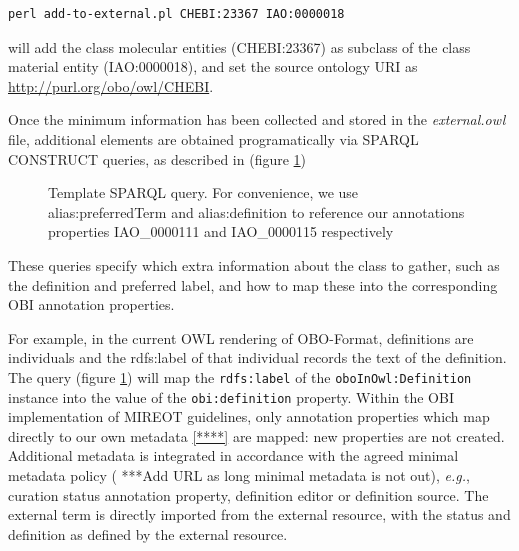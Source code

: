 \documentclass[a4paper,10pt,twocolumn]{article}
\begin{document}
\begin{footnotesize}
\begin{verbatim}
perl add-to-external.pl CHEBI:23367 IAO:0000018
\end{verbatim}
\end{footnotesize}

will add the class molecular entities (CHEBI:23367) as subclass of the class material entity (IAO:0000018), and set the source ontology URI as \url{http://purl.org/obo/owl/CHEBI}.

Once the minimum information has been collected  and stored in the \emph{external.owl} file, additional elements are obtained programatically via SPARQL\cite{RefWorks:1531} CONSTRUCT queries, as described in (figure \ref{fig:sparql})




\begin{figure}[t]
%  
\scriptsize
 
\caption{Template SPARQL query. For convenience, we use alias:preferredTerm and
alias:definition to reference our annotations properties IAO\_0000111 and IAO\_0000115 respectively}
\label{fig:sparql}
\end{figure}
These queries specify which extra information about the class to gather, such as the definition and preferred label, and how to map these into the corresponding OBI annotation properties. 

For example, in the current \ac{OWL} rendering of \ac{OBO}-Format, definitions are individuals and the rdfs:label of that individual records the text of the definition. %
The query (figure \ref{fig:sparql}) will map the \texttt{rdfs:label} of the \texttt{oboInOwl:Definition} instance into the value of the \texttt{obi:definition} property.
Within the \ac{OBI} implementation of \ac{MIREOT} guidelines, only annotation properties which map directly to our own metadata \ref{****} are mapped: new properties are not created.
Additional metadata is integrated in accordance with the agreed minimal metadata policy ( ***Add URL as long minimal metadata is not out), \emph{e.g.}, curation status annotation property, definition editor or definition source.
The external term is directly imported from the external resource, with the status and definition as defined by the external resource. %
\end{document}
